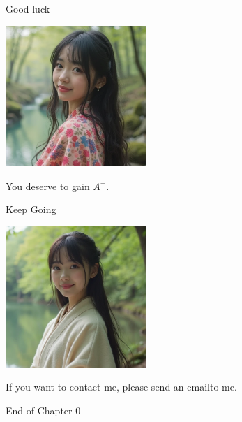 \documentclass{beamer}
\begin{document}
\begin{frame}{Good luck}
\begin{center}
\includegraphics[width=0.4\textwidth]{good_luck.png}
\end{center}
\begin{center}
You deserve to gain $A^+$.
\end{center}
\end{frame}
\begin{frame}{Keep Going}
\begin{center}
\includegraphics[width=0.4\textwidth]{kg.png}
\end{center}
\begin{center}
If you want to contact me, please send an emailto me.
\end{center}
\end{frame}
\begin{frame}{}
\begin{center}
\Large{End of Chapter 0}
\end{center}
\end{frame}
\end{document}
